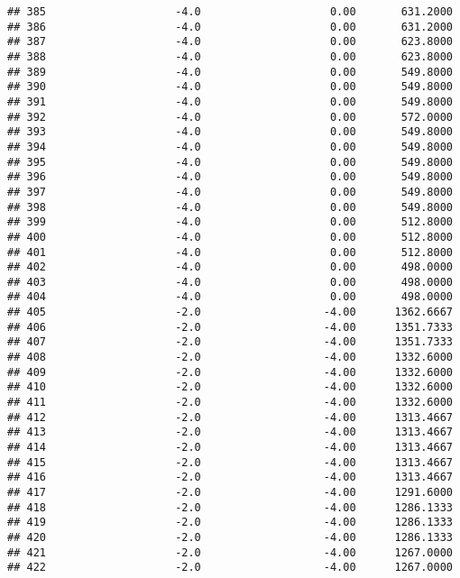 \documentclass[]{article}
\begin{document}
\begin{verbatim}
## 385                    -4.0                    0.00       631.2000
## 386                    -4.0                    0.00       631.2000
## 387                    -4.0                    0.00       623.8000
## 388                    -4.0                    0.00       623.8000
## 389                    -4.0                    0.00       549.8000
## 390                    -4.0                    0.00       549.8000
## 391                    -4.0                    0.00       549.8000
## 392                    -4.0                    0.00       572.0000
## 393                    -4.0                    0.00       549.8000
## 394                    -4.0                    0.00       549.8000
## 395                    -4.0                    0.00       549.8000
## 396                    -4.0                    0.00       549.8000
## 397                    -4.0                    0.00       549.8000
## 398                    -4.0                    0.00       549.8000
## 399                    -4.0                    0.00       512.8000
## 400                    -4.0                    0.00       512.8000
## 401                    -4.0                    0.00       512.8000
## 402                    -4.0                    0.00       498.0000
## 403                    -4.0                    0.00       498.0000
## 404                    -4.0                    0.00       498.0000
## 405                    -2.0                   -4.00      1362.6667
## 406                    -2.0                   -4.00      1351.7333
## 407                    -2.0                   -4.00      1351.7333
## 408                    -2.0                   -4.00      1332.6000
## 409                    -2.0                   -4.00      1332.6000
## 410                    -2.0                   -4.00      1332.6000
## 411                    -2.0                   -4.00      1332.6000
## 412                    -2.0                   -4.00      1313.4667
## 413                    -2.0                   -4.00      1313.4667
## 414                    -2.0                   -4.00      1313.4667
## 415                    -2.0                   -4.00      1313.4667
## 416                    -2.0                   -4.00      1313.4667
## 417                    -2.0                   -4.00      1291.6000
## 418                    -2.0                   -4.00      1286.1333
## 419                    -2.0                   -4.00      1286.1333
## 420                    -2.0                   -4.00      1286.1333
## 421                    -2.0                   -4.00      1267.0000
## 422                    -2.0                   -4.00      1267.0000

\end{verbatim}
\end{document}
